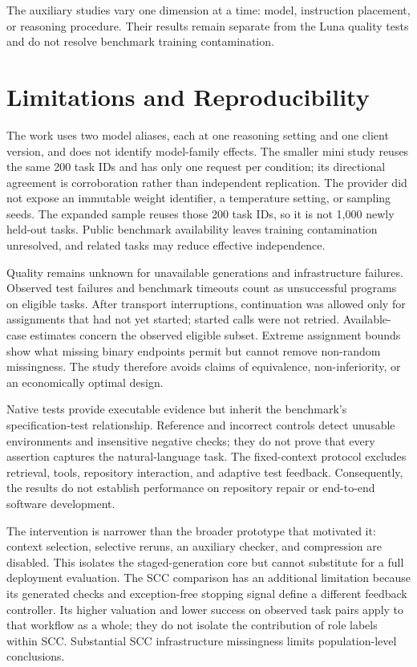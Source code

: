 The auxiliary studies vary one dimension at a time: model, instruction placement, or reasoning procedure. Their results remain separate from the Luna quality tests and do not resolve benchmark training contamination.

\section{Limitations and Reproducibility}
\aieditnote
The work uses two model aliases, each at one reasoning setting and one client version, and does not identify model-family effects. The smaller mini study reuses the same 200 task IDs and has only one request per condition; its directional agreement is corroboration rather than independent replication. The provider did not expose an immutable weight identifier, a temperature setting, or sampling seeds. The expanded sample reuses those 200 task IDs, so it is not 1,000 newly held-out tasks. Public benchmark availability leaves training contamination unresolved, and related tasks may reduce effective independence.

Quality remains unknown for unavailable generations and infrastructure failures. Observed test failures and benchmark timeouts count as unsuccessful programs on eligible tasks. After transport interruptions, continuation was allowed only for assignments that had not yet started; started calls were not retried. Available-case estimates concern the observed eligible subset. Extreme assignment bounds show what missing binary endpoints permit but cannot remove non-random missingness. The study therefore avoids claims of equivalence, non-inferiority, or an economically optimal design.

Native tests provide executable evidence but inherit the benchmark's specification-test relationship. Reference and incorrect controls detect unusable environments and insensitive negative checks; they do not prove that every assertion captures the natural-language task. The fixed-context protocol excludes retrieval, tools, repository interaction, and adaptive test feedback. Consequently, the results do not establish performance on repository repair or end-to-end software development.

The intervention is narrower than the broader prototype that motivated it: context selection, selective reruns, an auxiliary checker, and compression are disabled. This isolates the staged-generation core but cannot substitute for a full deployment evaluation. The SCC comparison has an additional limitation because its generated checks and exception-free stopping signal define a different feedback controller. Its higher valuation and lower success on observed task pairs apply to that workflow as a whole; they do not isolate the contribution of role labels within SCC. Substantial SCC infrastructure missingness limits population-level conclusions.

